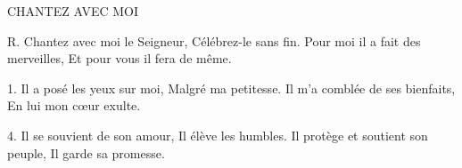CHANTEZ AVEC MOI

R. Chantez avec moi le Seigneur,
Célébrez-le sans fin.
Pour moi il a fait des merveilles,
Et pour vous il fera de même.

1. Il a posé les yeux sur moi,
Malgré ma petitesse.
Il m’a comblée de ses bienfaits,
En lui mon cœur exulte.

%

4. Il se souvient de son amour,
Il élève les humbles.
Il protège et soutient son peuple,
Il garde sa promesse.

